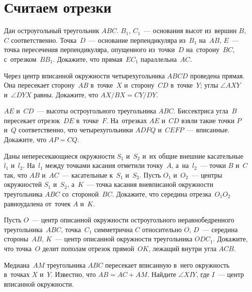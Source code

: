
\section*{Считаем отрезки}


\begin{problems}

\item
Дан остроугольный треугольник $ABC$.
$B_1$, $C_1$~--- основания высот из~вершин $B$, $C$ соответственно.
Точка~$D$~--- основание перпендикуляра из~$B_1$ на~$AB$, $E$~--- точка
пересечения перпендикуляра, опущенного из~точки~$D$ на~сторону~$BC$,
с~отрезком~$B B_1$.
Докажите, что прямая~$E C_1$ параллельна~$AC$.

\item
Через центр вписанной окружности четырехугольника $ABCD$ проведена
прямая.
Она пересекает сторону~$AB$ в~точке~$X$ и~сторону~$CD$ в~точке~$Y$;
углы $\angle AXY$ и~$\angle DYX$ равны.
Докажите, что $AX / BX = CY / DY$.

\item
$AE$ и~$CD$~--- высоты остроугольного треугольника $ABC$.
Биссектриса угла~$B$ пересекает отрезок~$DE$ в~точке~$F$.
На~отрезках $AE$ и~$CD$ взяли такие точки $P$ и~$Q$ соответственно, что
четырехугольники $ADFQ$ и~$CEFP$~--- вписанные.
Докажите, что $AP = CQ$.

\item
Даны непересекающиеся окружности $S_1$ и~$S_2$ и~их общие внешние
касательные $l_1$ и~$l_2$.
На~$l_1$ между точками касания отметили точку~$A$, а~на~$l_2$~---
точки $B$ и~$C$ так, что $AB$ и~$AC$~--- касательные к~$S_1$ и~$S_2$.
Пусть $O_1$ и~$O_2$~--- центры окружностей $S_1$ и~$S_2$, а~$K$~--- точка
касания вневписаной окружности треугольника $ABC$ со~стороной~$BC$.
Докажите, что середина отрезка~$O_1 O_2$ равноудалена от~точек $A$ и~$K$.

\item
Пусть $O$~--- центр описанной окружности остроугольного неравнобедренного
треугольника~$ABC$, точка~$C_1$ симметрична $C$ относительно $O$,
$D$~--- середина стороны~$AB$, $K$~--- центр описанной окружности
треугольника $O D C_1$.
Докажите, что точка~$O$ делит пополам отрезок прямой~$OK$, лежащий внутри
угла $ACB$.

\item
Медиана~$AM$ треугольника $ABC$ пересекает вписанную в~него окружность
в~точках $X$ и~$Y$.
Известно, что $AB = AC + AM$.
Найдите $\angle XIY$, где $I$~--- центр вписанной окружности.


\end{problems}
